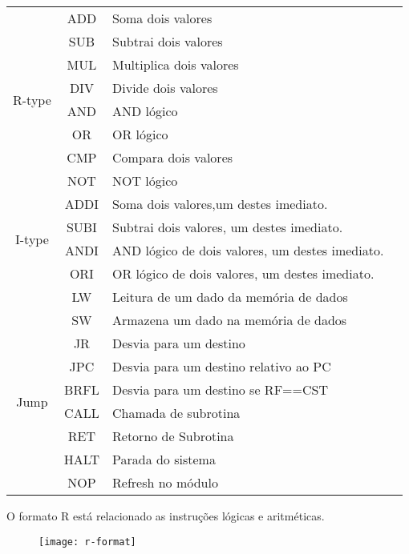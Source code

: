 \begin{center}
\begin{longtable}[pos]{| c | c | l | m{7cm} |}
			\multirow{8}{*}{R-type} & ADD & Soma dois valores \\ \cline{2-3}	
	& SUB & Subtrai dois valores \\ \cline{2-3}	
	& MUL & Multiplica dois valores \\ \cline{2-3}	
	& DIV & Divide dois valores \\ \cline{2-3}
	& AND & AND lógico \\ \cline{2-3}
	& OR & OR lógico  \\ \cline{2-3}
	& CMP & Compara dois valores \\ \cline{2-3}
	& NOT & NOT lógico \\ \hline 
	\multirow{4}{*}{I-type} & ADDI & Soma dois valores,um destes imediato. \\ \cline{2-3}
	& SUBI & Subtrai dois valores, um destes imediato. \\ \cline{2-3}
	& ANDI & AND lógico de dois valores, um destes imediato. \\ \cline{2-3}
	& ORI & OR lógico de dois valores, um destes imediato. \\ \cline{2-3}
	& LW & Leitura de um dado da memória de dados \\ \cline{2-3}
	& SW & Armazena um dado na memória de dados \\ \hline
	\multirow{6}{*}{Jump} & JR & Desvia para um destino \\ \cline{2-3}
	& JPC & Desvia para um destino relativo ao PC \\ \cline{2-3}
	& BRFL & Desvia para um destino se RF==CST \\ \cline{2-3}
	& CALL & Chamada de subrotina \\ \cline{2-3}
	& RET & Retorno de Subrotina \\ \cline{2-3}
	& HALT & Parada do sistema \\ \cline{2-3}
	& NOP & Refresh no módulo \\ \hline
\end{longtable}
\end{center}

	O formato R está relacionado as instruções lógicas e aritméticas.
	\begin{figure}[H]
    	\centering
    	\texttt{[image: r-format]}
	\end{figure}
	
